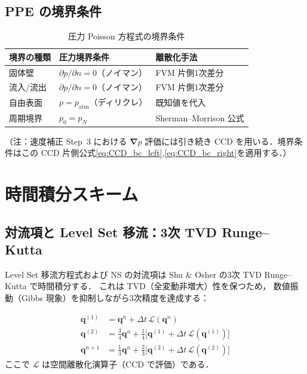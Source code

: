 \documentclass[12pt, a4paper, titlepage]{article}
\newcommand{\jp}[1]{{\normalfont\jpfont #1}}
\newcommand{\bnabla}{\bm{\nabla}}
\begin{document}
\subsection{PPE \jp{の境界条件}}

\begin{table}[h]
\centering
\caption{\jp{圧力 Poisson 方程式の境界条件}}
\begin{tabular}{lll}
\toprule
\jp{境界の種類} & \jp{圧力境界条件} & \jp{離散化手法}\\
\midrule
\jp{固体壁} & $\partial p/\partial n = 0$\jp{（ノイマン）} & \jp{FVM 片側1次差分}\\
\jp{流入/流出} & $\partial p/\partial n = 0$\jp{（ノイマン）} & \jp{FVM 片側1次差分}\\
\jp{自由表面} & $p = p_{\mathrm{atm}}$\jp{（ディリクレ）} & \jp{既知値を代入}\\
\jp{周期境界} & $p_0 = p_N$ & Sherman--Morrison \jp{公式}\\
\bottomrule
\end{tabular}
\end{table}
\jp{（注：速度補正 Step~3 における $\bnabla p$ 評価には引き続き CCD を用いる．境界条件はこの CCD 片側公式\eqref{eq:CCD_bc_left},\eqref{eq:CCD_bc_right}を適用する．）}


\section{\jp{時間積分スキーム}}
\label{sec:time}

\subsection{\jp{対流項と Level Set 移流：3次 TVD Runge--Kutta}}

\jp{Level Set 移流方程式および NS の対流項は
Shu \& Osher \cite{ShuOsher1988} の3次 TVD Runge--Kutta で時間積分する．
これは TVD（全変動非増大）性を保つため，
数値振動（Gibbs 現象）を抑制しながら3次精度を達成する：}

\begin{tcolorbox}[mybox, title={3\jp{次} TVD Runge--Kutta \jp{（Shu--Osher スキーム）}}]
\begin{align}
  \bm{q}^{(1)} &= \bm{q}^n + \Delta t\,\mathcal{L}(\bm{q}^n)
  \label{eq:TVDRK3_1}\\[4pt]
  \bm{q}^{(2)} &= \frac{3}{4}\bm{q}^n
               + \frac{1}{4}\bigl[\bm{q}^{(1)} + \Delta t\,\mathcal{L}(\bm{q}^{(1)})\bigr]
  \label{eq:TVDRK3_2}\\[4pt]
  \bm{q}^{n+1} &= \frac{1}{3}\bm{q}^n
               + \frac{2}{3}\bigl[\bm{q}^{(2)} + \Delta t\,\mathcal{L}(\bm{q}^{(2)})\bigr]
  \label{eq:TVDRK3_3}
\end{align}
\jp{ここで $\mathcal{L}$ は空間離散化演算子（CCD で評価）である．}
\end{tcolorbox}
\end{document}
